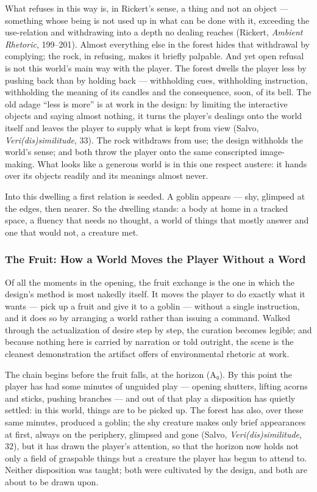 \documentclass{article}
\begin{document}
What refuses in this way is, in Rickert's sense, a thing and not an object — something whose being is not used up in what can be done with it, exceeding the use-relation and withdrawing into a depth no dealing reaches (Rickert, \textit{Ambient Rhetoric}, 199–201). Almost everything else in the forest hides that withdrawal by complying; the rock, in refusing, makes it briefly palpable. And yet open refusal is not this world's main way with the player. The forest dwells the player less by pushing back than by holding back — withholding cues, withholding instruction, withholding the meaning of its candles and the consequence, soon, of its bell. The old adage ``less is more'' is at work in the design: by limiting the interactive objects and saying almost nothing, it turns the player's dealings onto the world itself and leaves the player to supply what is kept from view (Salvo, \textit{Veri(dis)similitude}, 33). The rock withdraws from use; the design withholds the world's sense; and both throw the player onto the same conscripted image-making. What looks like a generous world is in this one respect austere: it hands over its objects readily and its meanings almost never.

Into this dwelling a first relation is seeded. A goblin appears — shy, glimpsed at the edges, then nearer. So the dwelling stands: a body at home in a tracked space, a fluency that needs no thought, a world of things that mostly answer and one that would not, a creature met.

\subsubsection*{The Fruit: How a World Moves the Player Without a Word}

Of all the moments in the opening, the fruit exchange is the one in which the design's method is most nakedly itself. It moves the player to do exactly what it wants — pick up a fruit and give it to a goblin — without a single instruction, and it does so by arranging a world rather than issuing a command. Walked through the actualization of desire step by step, the curation becomes legible; and because nothing here is carried by narration or told outright, the scene is the cleanest demonstration the artifact offers of environmental rhetoric at work.

The chain begins before the fruit falls, at the horizon (A₀). By this point the player has had some minutes of unguided play — opening shutters, lifting acorns and sticks, pushing branches — and out of that play a disposition has quietly settled: in this world, things are to be picked up. The forest has also, over these same minutes, produced a goblin; the shy creature makes only brief appearances at first, always on the periphery, glimpsed and gone (Salvo, \textit{Veri(dis)similitude}, 32), but it has drawn the player's attention, so that the horizon now holds not only a field of graspable things but a creature the player has begun to attend to. Neither disposition was taught; both were cultivated by the design, and both are about to be drawn upon.
\end{document}
